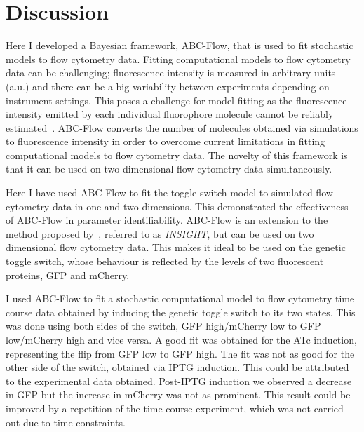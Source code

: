 \section{Discussion}

Here I developed a Bayesian framework, ABC-Flow, that is used to fit stochastic models to flow cytometry data. Fitting computational models to flow cytometry data can be challenging; fluorescence intensity is measured in arbitrary units (a.u.) and there can be a big variability between experiments depending on instrument settings. This poses a challenge for model fitting as the fluorescence intensity emitted by each individual fluorophore molecule cannot be reliably estimated~\autocite{Kelwick:2014iy}. ABC-Flow converts the number of molecules obtained via simulations to fluorescence intensity in order to overcome current limitations in fitting computational models to flow cytometry data. The novelty of this framework is that it can be used on two-dimensional flow cytometry data simultaneously. 

Here I have used ABC-Flow to fit the toggle switch model to simulated flow cytometry data in one and two dimensions. This demonstrated the effectiveness of ABC-Flow in parameter identifiability. ABC-Flow is an extension to the method proposed by~\textcite{Lillacci:2013hu}, referred to as \textit{INSIGHT}, but can be used on two dimensional flow cytometry data. This makes it ideal to be used on the genetic toggle switch, whose behaviour is reflected by the levels of two fluorescent proteins, GFP and mCherry.


I used ABC-Flow to fit a stochastic computational model to flow cytometry  time course data obtained by inducing the genetic toggle switch to its two states. This was done using both sides of the switch, GFP high/mCherry low to GFP low/mCherry high and vice versa. A good fit was obtained for the ATc induction, representing the flip from GFP low to GFP high. The fit was not as good for the other side of the switch, obtained via IPTG induction. This could be attributed to the experimental data obtained. Post-IPTG induction we observed a decrease in GFP but the increase in mCherry was not as prominent. This result could be improved by a repetition of the time course experiment, which was not carried out due to time constraints.

